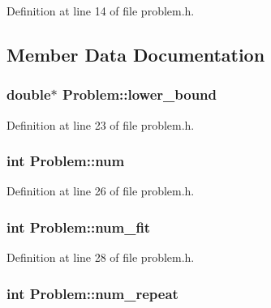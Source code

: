 Definition at line 14 of file problem.\+h.



\subsection{Member Data Documentation}
\hypertarget{class_problem_a4dfde0675e59264970f418516b799b2c}{}
\subsubsection[{lower\+\_\+bound}]{\setlength{\rightskip}{0pt plus 5cm}double$\ast$ Problem\+::lower\+\_\+bound}\label{class_problem_a4dfde0675e59264970f418516b799b2c}


Definition at line 23 of file problem.\+h.

\hypertarget{class_problem_ae46e65561288cc81f06c2ddae062d303}{}
\subsubsection[{num}]{\setlength{\rightskip}{0pt plus 5cm}int Problem\+::num}\label{class_problem_ae46e65561288cc81f06c2ddae062d303}


Definition at line 26 of file problem.\+h.

\hypertarget{class_problem_a11dbb1d5a91b82ac8bab777362003e43}{}
\subsubsection[{num\+\_\+fit}]{\setlength{\rightskip}{0pt plus 5cm}int Problem\+::num\+\_\+fit}\label{class_problem_a11dbb1d5a91b82ac8bab777362003e43}


Definition at line 28 of file problem.\+h.

\hypertarget{class_problem_a02dc7cd36750260516f536d4b519399d}{}
\subsubsection[{num\+\_\+repeat}]{\setlength{\rightskip}{0pt plus 5cm}int Problem\+::num\+\_\+repeat}\label{class_problem_a02dc7cd36750260516f536d4b519399d}


